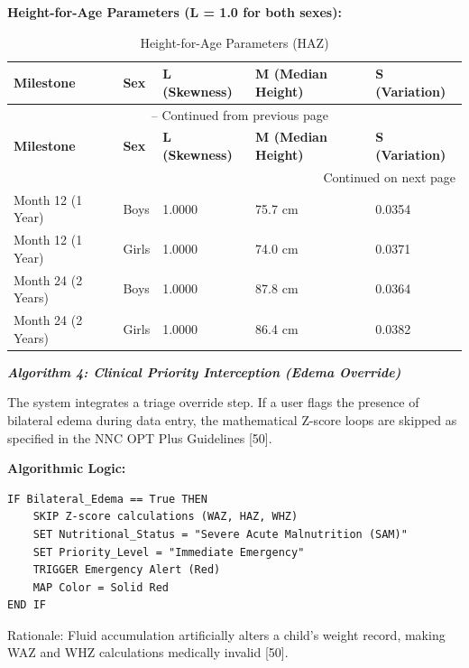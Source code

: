 \documentclass[12pt, a4paper]{report}
\begin{document}
\noindent \textbf{Height-for-Age Parameters (L = 1.0 for both sexes):}

\vspace{0.3cm}
\begin{longtable}{p{3.5cm} p{2.5cm} p{3cm} p{3.5cm} p{3cm}}
    \caption{Height-for-Age Parameters (HAZ)} \label{tab:haz_params} \\
    \toprule
    \textbf{Milestone} & \textbf{Sex} & \textbf{L (Skewness)} & \textbf{M (Median Height)} & \textbf{S (Variation)} \\
    \midrule
    \endfirsthead
    \multicolumn{5}{c}{{\tablename\ \thetable{} -- Continued from previous page}} \\
    \toprule
    \textbf{Milestone} & \textbf{Sex} & \textbf{L (Skewness)} & \textbf{M (Median Height)} & \textbf{S (Variation)} \\
    \midrule
    \endhead
    \midrule
    \multicolumn{5}{r}{{Continued on next page}} \\
    \endfoot
    \bottomrule
    \endlastfoot
    Month 12 (1 Year) & Boys & 1.0000 & 75.7 cm & 0.0354 \\
    \addlinespace
    Month 12 (1 Year) & Girls & 1.0000 & 74.0 cm & 0.0371 \\
    \addlinespace
    Month 24 (2 Years) & Boys & 1.0000 & 87.8 cm & 0.0364 \\
    \addlinespace
    Month 24 (2 Years) & Girls & 1.0000 & 86.4 cm & 0.0382 \\
\end{longtable}
\vspace{0.3cm}

\noindent \textbf{\textit{Algorithm 4: Clinical Priority Interception (Edema Override)}}

The system integrates a triage override step. If a user flags the presence of bilateral edema during data entry, the mathematical Z-score loops are skipped as specified in the NNC OPT Plus Guidelines [50].

\noindent \textbf{Algorithmic Logic:}
\begin{verbatim}
IF Bilateral_Edema == True THEN
    SKIP Z-score calculations (WAZ, HAZ, WHZ)
    SET Nutritional_Status = "Severe Acute Malnutrition (SAM)"
    SET Priority_Level = "Immediate Emergency"
    TRIGGER Emergency Alert (Red)
    MAP Color = Solid Red
END IF
\end{verbatim}

Rationale: Fluid accumulation artificially alters a child's weight record, making WAZ and WHZ calculations medically invalid [50].
\end{document}
